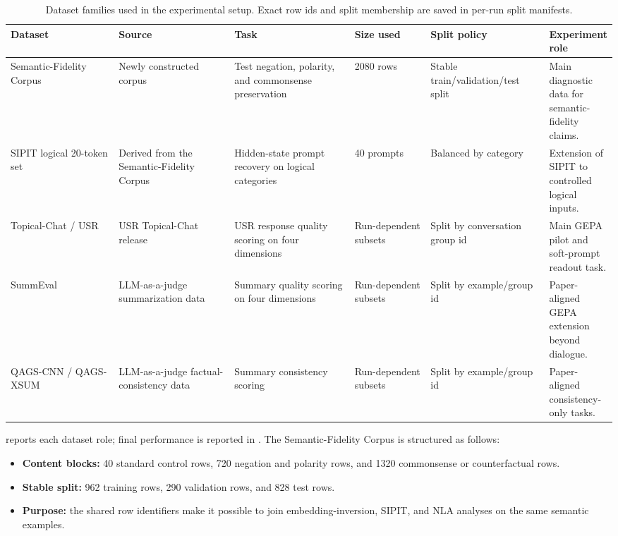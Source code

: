 \documentclass[12pt,a4paper,twoside,openright]{book}
\begin{document}
\begin{table}[!htb]
    \centering
    \scriptsize
    \begin{adjustbox}{width=\textwidth}
    \begin{tabular}{p{0.19\linewidth} p{0.20\linewidth} p{0.21\linewidth} p{0.13\linewidth} p{0.20\linewidth} p{0.19\linewidth}}
        \toprule
        \textbf{Dataset} & \textbf{Source} & \textbf{Task} & \textbf{Size used} & \textbf{Split policy} & \textbf{Experiment role} \\
        \midrule
        Semantic-Fidelity Corpus &
        Newly constructed corpus &
        Test negation, polarity, and commonsense preservation &
        2080 rows &
        Stable train/validation/test split &
        Main diagnostic data for semantic-fidelity claims. \\
        SIPIT logical 20-token set &
        Derived from the Semantic-Fidelity Corpus &
        Hidden-state prompt recovery on logical categories &
        40 prompts &
        Balanced by category &
        Extension of SIPIT to controlled logical inputs. \\
        Topical-Chat / USR &
        USR Topical-Chat release &
        USR response quality scoring on four dimensions &
        Run-dependent subsets &
        Split by conversation group id &
        Main GEPA pilot and soft-prompt readout task. \\
        SummEval &
        LLM-as-a-judge summarization data &
        Summary quality scoring on four dimensions &
        Run-dependent subsets &
        Split by example/group id &
        Paper-aligned GEPA extension beyond dialogue. \\
        QAGS-CNN / QAGS-XSUM &
        LLM-as-a-judge factual-consistency data &
        Summary consistency scoring &
        Run-dependent subsets &
        Split by example/group id &
        Paper-aligned consistency-only tasks. \\
        \bottomrule
    \end{tabular}
    \end{adjustbox}
    \caption{Dataset families used in the experimental setup. Exact row ids and
    split membership are saved in per-run split manifests.}
    \label{tab:setup-datasets}
\end{table}

 reports each dataset role; final performance is
reported in . The Semantic-Fidelity Corpus is
structured as follows:
\begin{itemize}
    \item \textbf{Content blocks:} 40 standard control rows, 720 negation and
    polarity rows, and 1320 commonsense or counterfactual rows.
    \item \textbf{Stable split:} 962 training rows, 290 validation rows, and
    828 test rows.
    \item \textbf{Purpose:} the shared row identifiers make it possible to join
    embedding-inversion, SIPIT, and NLA analyses on the same semantic examples.
\end{itemize}
\end{document}
